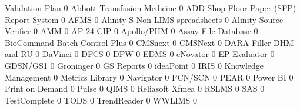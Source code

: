\documentclass{article}
\begin{document}
\begin{Schunk}
\begin{Soutput}
                                           Validation Plan
                                                         0
  Abbott Transfusion Medicine                            0
  ADD Shop Floor Paper (SFP) Report System               0
  AFMS                                                   0
  Alinity S Non-LIMS spreadsheets                        0
  Alinity Source Verifier                                0
  AMM                                                    0
  AP 24 CIP                                              0
  Apollo/PHM                                             0
  Assay File Database                                    0
  BioCommand Batch Control Plus                          0
  CMSnext                                                0
  CMSNext                                                0
  DARA Filler DHM and RU                                 0
  DaVinci                                                0
  DFCS                                                   0
  DPW                                                    0
  EDMS                                                   0
  eNovator                                               0
  EP Evaluator                                           0
  GDSN/GS1                                               0
  Groninger                                              0
  GS Reports                                             0
  ideaPoint                                              0
  IRIS                                                   0
  Knowledge Management                                   0
  Metrics Library                                        0
  Navigator                                              0
  PCN/SCN                                                0
  PEAR                                                   0
  Power BI                                               0
  Print on Demand                                        0
  Pulse                                                  0
  QIMS                                                   0
  Reliasoft Xfmea                                        0
  RSLMS                                                  0
  SAS                                                    0
  TestComplete                                           0
  TODS                                                   0
  TrendReader                                            0
  WWLIMS                                                 0
\end{Soutput}
\end{Schunk}
\end{document}
